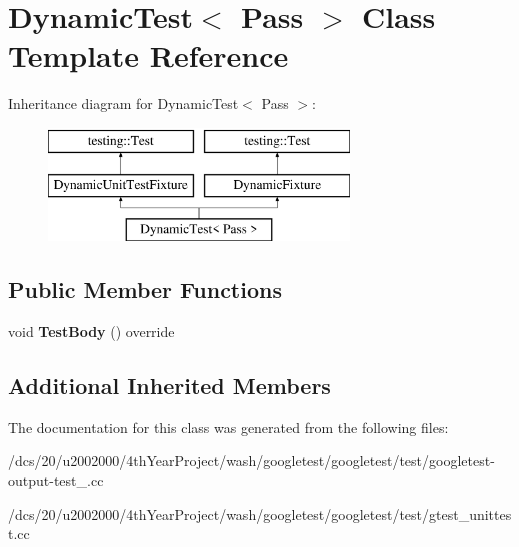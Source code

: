 \hypertarget{classDynamicTest}{}\section{Dynamic\+Test$<$ Pass $>$ Class Template Reference}
\label{classDynamicTest}
Inheritance diagram for Dynamic\+Test$<$ Pass $>$\+:\begin{figure}[H]
\begin{center}
\leavevmode
\includegraphics[height=3.000000cm]{classDynamicTest}
\end{center}
\end{figure}
\subsection*{Public Member Functions}
\begin{DoxyCompactItemize}
\item 
\mbox{\label{classDynamicTest_afc4a0a94673a3d37709f9cd03e82b821}} 
void {\bfseries Test\+Body} () override
\end{DoxyCompactItemize}
\subsection*{Additional Inherited Members}


The documentation for this class was generated from the following files\+:\begin{DoxyCompactItemize}
\item 
/dcs/20/u2002000/4th\+Year\+Project/wash/googletest/googletest/test/googletest-\/output-\/test\+\_\+.\+cc\item 
/dcs/20/u2002000/4th\+Year\+Project/wash/googletest/googletest/test/gtest\+\_\+unittest.\+cc\end{DoxyCompactItemize}
